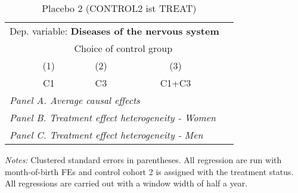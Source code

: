  \begin{table}[H] \centering \begin{threeparttable} \caption{Placebo 2 (CONTROL2 ist TREAT) } {\def\sym#1{\ifmmode^{#1}\else\(^{#1}\)\fi} \begin{tabular}{l*{4}{c}} \toprule \multicolumn{4}{l}{Dep. variable: \textbf{Diseases of the nervous system}} \\ & \multicolumn{3}{c}{Choice of control group} \\ \cmidrule(lr){2-4}
            &\multicolumn{1}{c}{(1)}&\multicolumn{1}{c}{(2)}&\multicolumn{1}{c}{(3)}\\
            &\multicolumn{1}{c}{C1}&\multicolumn{1}{c}{C3}&\multicolumn{1}{c}{C1+C3}\\
\midrule
 \multicolumn{4}{l}{\emph{Panel A. Average causal effects}} \\      \midrule\multicolumn{4}{l}{\emph{Panel B. Treatment effect heterogeneity - Women}} \\      \midrule\multicolumn{4}{l}{\emph{Panel C. Treatment effect heterogeneity - Men}} \\      
\bottomrule \end{tabular} } \begin{tablenotes} \item \scriptsize \emph{Notes:} Clustered standard errors in parentheses. All regression are run with month-of-birth FEs and control cohort 2 is assigned with the treatment status. All regressions are carried out with a window width of half a year. \end{tablenotes} \end{threeparttable} \end{table} 
